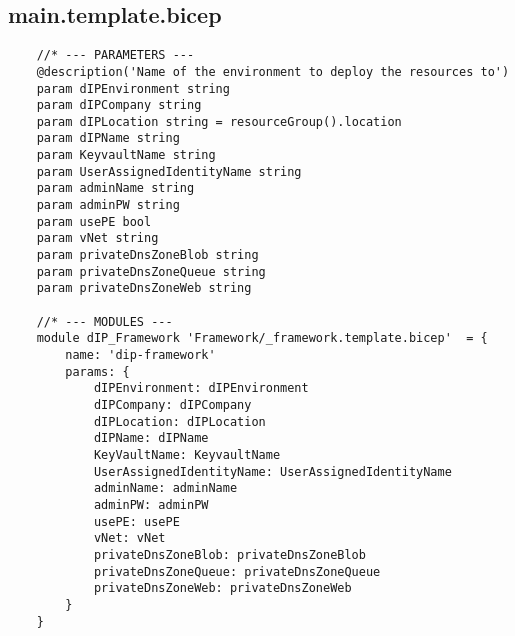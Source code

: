 \documentclass[dutch,dit,thesis]{hogentreport}
\begin{document}
\subsection{main.template.bicep}
\label{sec:main.template.bicep}
\begin{lstlisting}
    //* --- PARAMETERS ---
    @description('Name of the environment to deploy the resources to')
    param dIPEnvironment string
    param dIPCompany string
    param dIPLocation string = resourceGroup().location
    param dIPName string
    param KeyvaultName string
    param UserAssignedIdentityName string
    param adminName string
    param adminPW string
    param usePE bool
    param vNet string
    param privateDnsZoneBlob string
    param privateDnsZoneQueue string
    param privateDnsZoneWeb string

    //* --- MODULES ---
    module dIP_Framework 'Framework/_framework.template.bicep'  = {
        name: 'dip-framework'
        params: {
            dIPEnvironment: dIPEnvironment
            dIPCompany: dIPCompany
            dIPLocation: dIPLocation
            dIPName: dIPName
            KeyVaultName: KeyvaultName
            UserAssignedIdentityName: UserAssignedIdentityName
            adminName: adminName
            adminPW: adminPW
            usePE: usePE
            vNet: vNet
            privateDnsZoneBlob: privateDnsZoneBlob
            privateDnsZoneQueue: privateDnsZoneQueue
            privateDnsZoneWeb: privateDnsZoneWeb
        }
    }
\end{lstlisting}
\end{document}
